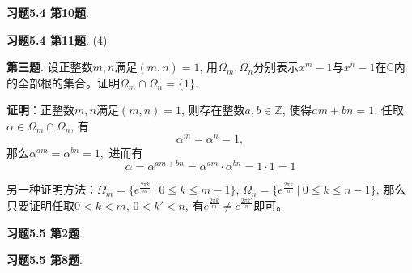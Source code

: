 
\renewcommand{\newpageorvspace}{\vspace{2em}}

\date{2021-12-24  第七次习题课}



\maketitle

{\bf 习题5.4 第10题}. 


\newpageorvspace


{\bf 习题5.4 第11题}. (4)


\newpageorvspace



{\bf 第三题}. 设正整数$m,n$满足$(m,n)=1$, 用$\Omega_m, \Omega_n$分别表示$x^m-1$与$x^n-1$在$\mathbb{C}$内的全部根的集合。证明$\Omega_m \cap \Omega_n = \{1\}$.

{\bf 证明}：正整数$m,n$满足$(m,n)=1$, 则存在整数$a,b\in\mathbb{Z}$, 使得$am+bn=1$. 任取$\alpha\in \Omega_m \cap \Omega_n$, 有
$$\alpha^m = \alpha^n = 1,$$
那么$\alpha^{am} = \alpha^{bn} = 1,$ 进而有
$$\alpha = \alpha^{am+bn} = \alpha^{am} \cdot \alpha^{bn} = 1 \cdot 1 = 1$$

另一种证明方法：$\Omega_m = \{ e^{\frac{2\pi k}{m}} \ |\ 0\leqslant k \leqslant m-1 \}$, $\Omega_n = \{ e^{\frac{2\pi k}{n}} \ |\ 0\leqslant k \leqslant n-1 \}$, 那么只要证明任取$0 < k < m$, $0 < k' < n$, 有$e^{\frac{2\pi k}{m}} \neq e^{\frac{2\pi k'}{n}}$即可。


\newpageorvspace


{\bf 习题5.5 第2题}. 


\newpageorvspace


{\bf 习题5.5 第8题}. 


\newpageorvspace



